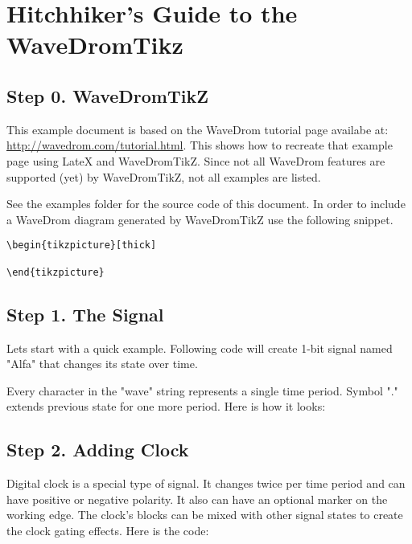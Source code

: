 \documentclass{article}
\begin{document}
\section{Hitchhiker's Guide to the WaveDromTikz}

\subsection{Step 0. WaveDromTikZ}
This example document is based on the WaveDrom tutorial page availabe at:
\url{http://wavedrom.com/tutorial.html}. This shows how to recreate that example page
using LateX and WaveDromTikZ. Since not all WaveDrom features are supported (yet)
by WaveDromTikZ, not all examples are listed.

See the examples folder for the source code of this document.
In order to include a WaveDrom diagram generated by WaveDromTikZ use the following snippet.
\begin{lstlisting}
\begin{tikzpicture}[thick]
    
\end{tikzpicture}
\end{lstlisting}

\subsection{Step 1. The Signal}

Lets start with a quick example. Following code will create 1-bit signal named "Alfa" that changes its state over time.

Every character in the "wave" string represents a single time period. Symbol "." extends previous state for one more period. Here is how it looks: 

\begin{tikzpicture}[thick]
    
\end{tikzpicture}

\subsection{Step 2. Adding Clock}

Digital clock is a special type of signal. It changes twice per time period and can have positive or negative polarity. It also can have an optional marker on the working edge. The clock's blocks can be mixed with other signal states to create the clock gating effects. Here is the code: 
\end{document}
